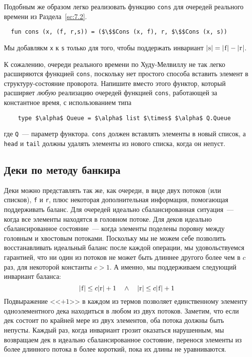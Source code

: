 Подобным же образом легко реализовать функцию \lstinline!cons! для
очередей реального времени из Раздела~\ref{sc:7.2}.
\begin{lstlisting}
  fun cons (x, (f, r,s)) = ($\$$Cons (x, f), r, $\$$Cons (x, s))
\end{lstlisting}
Мы добавлякм \lstinline!x! к \lstinline!s! только для того, чтобы
поддержать инвариант $|\lstinline!s!| = |\lstinline!f!| - |\lstinline!r!$|.

\begin{exercise}\label{ex:8.4}
  К сожалению, очереди реального времени по Худу-Мелвиллу не так легко
  расширяются функцией \lstinline!cons!, поскольку нет простого
  способа вставить элемент в структуру-состояние проворота. Напишите
  вместо этого функтор, который расширяет \emph{любую} реализацию
  очередей функцией \lstinline!cons!, работающей за константное время,
  с использованием типа
  \begin{lstlisting}
    type $\alpha$ Queue = $\alpha$ list $\times$ $\alpha$ Q.Queue
  \end{lstlisting}
  где \lstinline!Q!~--- параметр функтора. \lstinline!cons! должен
  вставлять элементы в новый список, а \lstinline!head! и
  \lstinline!tail! должны удалять элементы из нового списка, когда он
  непуст.
\end{exercise}

\subsection{Деки по методу банкира}
\label{sc:8.4.2}

Деки можно представлять так же, как очереди, в виде двух потоков (или списков),
\lstinline!f! и \lstinline!r!, плюс некоторая дополнительная
информация, помогающая поддерживать баланс. Для очередей идеально
сбалансированная ситуация~--- когда все элементы находятся в головном
потоке. Для деков идеально сбалансированное состояние~--- когда
элементы поделены поровну между головным и хвостовым
потоками. Поскольку мы не можем себе позволить восстанавливать
идеальный баланс после каждой операции, мы удовольствуемся гарантией,
что ни один из потоков не может быть длиннее другого более чем в $c$
раз, для некоторой константы $c > 1$. А именно, мы поддерживаем
следующий инвариант баланса:
$$
  |\lstinline!f!| \le c |\lstinline!r!| + 1 \quad \land \quad
  |\lstinline!r!| \le c |\lstinline!f!| + 1
$$
Подвыражение <<$+1$>> в каждом из термов позволяет единственному
элементу одноэлементного дека находиться в любом из двух
потоков. Заметим, что если дек состоит по крайней мере из двух
элементов, оба потока должны быть непусты. Каждый раз, когда инвариант
грозит оказаться нарушенным, мы возвращаем дек в идеально
сбалансированное состояние, перенося элементы из более длинного потока
в более короткий, пока их длины не уравниваются.

